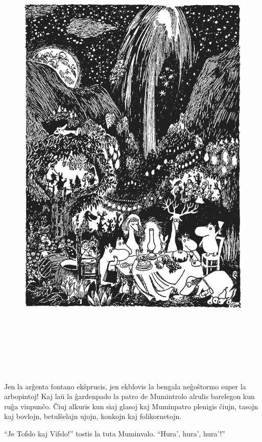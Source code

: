 \begin{figure}[htbp]
\centering
\includegraphics[width=451pt,height=633pt]{_34.jpg}
\caption{}
\label{_34}
\end{figure}

Jen la arĝenta fontano ekŝprucis, jen ekblovis la bengala neĝoŝtormo super la arbopintoj! Kaj laŭ la ĝardenpado la patro de Mumintrolo alrulis barelegon kun ruĝa vinpunĉo. Ĉiuj alkuris kun siaj glasoj kaj Muminpatro plenigis ĉiujn, tasojn kaj bovlojn, betulŝelajn ujojn, konkojn kaj folikornetojn.

``Je Tofslo kaj Vifslo!'' tostis la tuta Muminvalo. ``Hura', hura', hura'!''

